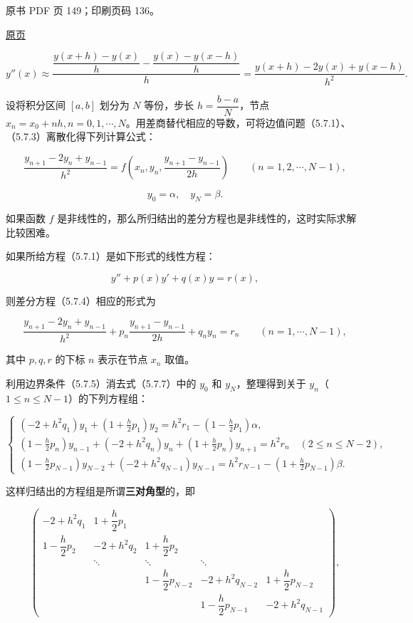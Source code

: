 \clearpage

原书 PDF 页 149；印刷页码 136。

\href{source-images/pdf-149.jpeg}{原页}

\[
y''(x)\approx\frac{\dfrac{y(x+h)-y(x)}h-\dfrac{y(x)-y(x-h)}h}{h}
=\frac{y(x+h)-2y(x)+y(x-h)}{h^2}.
\]

设将积分区间 \([a,b]\) 划分为 \(N\) 等份，步长 \(h=\dfrac{b-a}{N}\)，节点 \(x_n=x_0+nh,n=0,1,\cdots,N\)。用差商替代相应的导数，可将边值问题（5.7.1）、（5.7.3）离散化得下列计算公式：

\[
\frac{y_{n+1}-2y_n+y_{n-1}}{h^2}=f\left(x_n,y_n,\frac{y_{n+1}-y_{n-1}}{2h}\right)\qquad(n=1,2,\cdots,N-1),
\tag{5.7.4}
\]

\[
y_0=\alpha,\quad y_N=\beta.
\tag{5.7.5}
\]

如果函数 \(f\) 是非线性的，那么所归结出的差分方程也是非线性的，这时实际求解比较困难。

如果所给方程（5.7.1）是如下形式的线性方程：

\[
y''+p(x)y'+q(x)y=r(x),
\tag{5.7.6}
\]

则差分方程（5.7.4）相应的形式为

\[
\frac{y_{n+1}-2y_n+y_{n-1}}{h^2}+p_n\frac{y_{n+1}-y_{n-1}}{2h}+q_ny_n=r_n\qquad(n=1,\cdots,N-1),
\tag{5.7.7}
\]

其中 \(p,q,r\) 的下标 \(n\) 表示在节点 \(x_n\) 取值。

利用边界条件（5.7.5）消去式（5.7.7）中的 \(y_0\) 和 \(y_N\)，整理得到关于 \(y_n\)（\(1\le n\le N-1\)）的下列方程组：

\[
\begin{cases}
\displaystyle(-2+h^2q_1)y_1+\left(1+\frac h2p_1\right)y_2=h^2r_1-\left(1-\frac h2p_1\right)\alpha,\\[6pt]
\displaystyle\left(1-\frac h2p_n\right)y_{n-1}+(-2+h^2q_n)y_n+\left(1+\frac h2p_n\right)y_{n+1}=h^2r_n\quad(2\le n\le N-2),\\[6pt]
\displaystyle\left(1-\frac h2p_{N-1}\right)y_{N-2}+(-2+h^2q_{N-1})y_{N-1}=h^2r_{N-1}-\left(1+\frac h2p_{N-1}\right)\beta.
\end{cases}
\tag{5.7.8}
\]

这样归结出的方程组是所谓\textbf{三对角型}的，即

\[
\begin{pmatrix}
-2+h^2q_1 & 1+\dfrac h2p_1 & & & \\
1-\dfrac h2p_2 & -2+h^2q_2 & 1+\dfrac h2p_2 & & \\
& \ddots & \ddots & \ddots & \\
& & 1-\dfrac h2p_{N-2} & -2+h^2q_{N-2} & 1+\dfrac h2p_{N-2} \\
& & & 1-\dfrac h2p_{N-1} & -2+h^2q_{N-1}
\end{pmatrix},
\]

